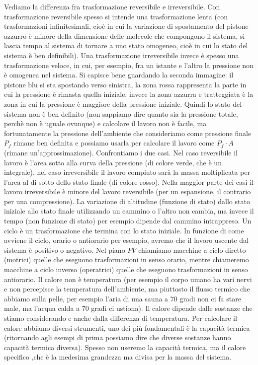 \newline[7] Vediamo la differenza fra trasformazione reversibile e irreversibile. Con trasformazione reversibile spesso si intende una trasformazione lenta (con trasformazioni infinitesimali, cioè in cui la variazione di spostamento del pistone azzurro è minore della dimensione delle molecole che compongono il sistema, si lascia tempo al sistema di tornare a uno stato omogeneo, cioè in cui lo stato del sistema è ben definibili). Una trasformazione irreversibile invece è spesso una trasformazione veloce, in cui, per esempio, fra un istante e l'altro la pressione non è omogenea nel sistema. Si capisce bene guardando la seconda immagine: il pistone blu si sta spostando verso sinistra, la zona rossa rappresenta la parte in cui la pressione è rimasta quella iniziale, invece la zona azzurra e tratteggiata è la zona in cui la pressione è maggiore della pressione iniziale. Quindi lo stato del sistema non è ben definito (non sappiamo dire quanto sia la pressione totale, perchè non è uguale ovunque) e calcolare il lavoro non è facile, ma fortunatamente la pressione dell'ambiente che consideriamo come pressione finale $P_f$ rimane ben definita e possiamo usarla per calcolare il lavoro come $P_f \cdot A$ (rimane un'approssimazione).
\newline[8] 
\newline[9] Confrontiamo i due casi. Nel caso reversibile il lavoro è l'area sotto alla curva della pressione (di colore verde, che è un integrale), nel caso irreversibile il lavoro compiuto sarà la massa moltiplicata per l'area al di sotto dello stato finale (di colore rosso). Nella maggior parte dei casi il lavoro irreversibile è minore del lavoro reversibile (per un espansione, il contrario per una compressione). 
\newline[10] La variazione di altitudine (funzione di stato) dallo stato iniziale allo stato finale utilizzando un cammino o l'altro non cambia, ma invece il tempo (non funzione di stato) per esempio dipende dal cammino intrappreso. 
\newline[11] 
\newline[12] Un ciclo è un trasformazione che termina con lo stato iniziale. In funzione di come avviene il ciclo, orario o antiorario per esempio, avremo che il lavoro uscente dal sistema è positivo o negativo. Nel piano $PV$ chiamiamo macchine a ciclo diretto (motrici) quelle che eseguono trasformazioni in senso orario, mentre chiameremo macchine a ciclo inverso (operatrici) quelle che eseguono trasformazioni in senso antiorario.
\newline[13] Il calore non è temperatura (per esempio il corpo umano ha vari nervi e non percepisce la temperatura dell'ambiente, ma piuttosto il flusso termico che abbiamo sulla pelle, per esempio l'aria di una sauna a 70 gradi non ci fa stare male, ma l'acqua calda a 70 gradi ci ustiona). Il calore dipende dalle sostanze che stiamo considerando e anche dalla differenza di temperatura. Per calcolare il calore abbiamo diversi strumenti, uno dei più fondamentali è la capacità termica (ritornando agli esempi di prima possiamo dire che diverse sostanze hanno capacità termica diversa). Spesso non useremo la capacità termica, ma il calore specifico ,che è la medesima grandezza ma divisa per la massa del sistema. 

